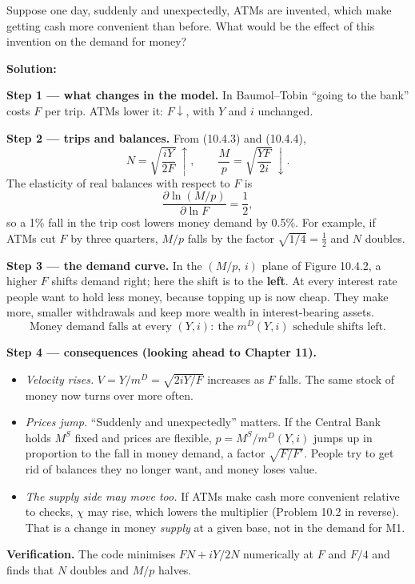 \documentclass[12pt, letterpaper]{article}
\newcommand{\mD}{m^{D}}
\newcommand{\Ms}{M^{S}}
\begin{document}
\begin{tcolorbox}[evenbox,title={Problem 10.4 \quad ATMs}]
\begin{tcolorbox}[questionbox]
Suppose one day, suddenly and unexpectedly, ATMs are invented, which make getting cash more
convenient than before. What would be the effect of this invention on the demand for money?
\end{tcolorbox}

\textbf{Solution:}

\textbf{Step 1 --- what changes in the model.} In Baumol--Tobin ``going to the bank'' costs
$F$ per trip. ATMs lower it: $F\downarrow$, with $Y$ and $i$ unchanged.

\textbf{Step 2 --- trips and balances.} From (10.4.3) and (10.4.4),
\[
N=\sqrt{\frac{iY}{2F}}\ \uparrow,\qquad
\frac{M}{p}=\sqrt{\frac{YF}{2i}}\ \downarrow .
\]
The elasticity of real balances with respect to $F$ is
\[
\frac{\partial \ln(M/p)}{\partial\ln F}=\frac12 ,
\]
so a 1\% fall in the trip cost lowers money demand by 0.5\%. For example, if ATMs cut $F$ by
three quarters, $M/p$ falls by the factor $\sqrt{1/4}=\tfrac12$ and $N$ doubles.

\textbf{Step 3 --- the demand curve.} In the $(M/p,\,i)$ plane of Figure 10.4.2, a higher $F$
shifts demand right; here the shift is to the \textbf{left}. At every interest rate people
want to hold less money, because topping up is now cheap. They make more, smaller
withdrawals and keep more wealth in interest-bearing assets.
\[
\boxed{\text{Money demand falls at every }(Y,i):\ \text{the }\mD(Y,i)\text{ schedule shifts left.}}
\]

\textbf{Step 4 --- consequences (looking ahead to Chapter 11).}
\begin{itemize}
\item \emph{Velocity rises.} $V=Y/\mD=\sqrt{2iY/F}$ increases as $F$ falls. The same stock of
money now turns over more often.
\item \emph{Prices jump.} ``Suddenly and unexpectedly'' matters. If the Central Bank holds
$\Ms$ fixed and prices are flexible, $p=\Ms/\mD(Y,i)$ jumps up in proportion to the fall in
money demand, a factor $\sqrt{F/F'}$. People try to get rid of balances they no longer want,
and money loses value.
\item \emph{The supply side may move too.} If ATMs make cash more convenient relative to
checks, $\chi$ may rise, which lowers the multiplier (Problem 10.2 in reverse). That is a
change in money \emph{supply} at a given base, not in the demand for M1.
\end{itemize}

\textbf{Verification.} The code minimises $FN+iY/2N$ numerically at $F$ and $F/4$ and finds that
$N$ doubles and $M/p$ halves. \checkmark
\end{tcolorbox}
\end{document}

